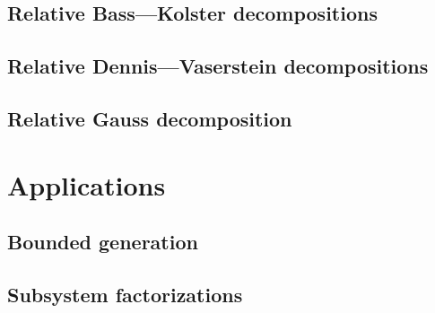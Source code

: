 \documentclass[12pt]{amsart}
\numberwithin{equation}{section}
\theoremstyle{definition}
\begin{document}
\subsection{Relative Bass---Kolster decompositions}\label{sec:bass-kolster}

\subsection{Relative Dennis---Vaserstein decompositions}\label{sec:dennis-vaserstein}

\subsection{Relative Gauss decomposition}\label{sec:gauss}


\section{Applications}\label{sec:applications}
\subsection{Bounded generation}\label{sec:boundgen}

\subsection{Subsystem factorizations}\label{sec:subsysfact}


\printbibliography
\end{document}
